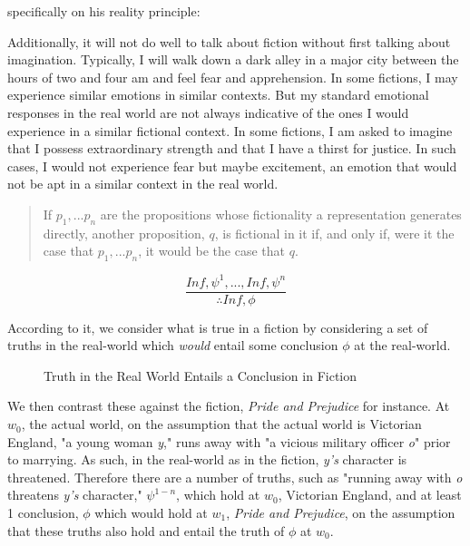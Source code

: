 \documentclass[phdthesis,12pt,final,a4paper]{wuthesis}
\theoremstyle{definition}
\theoremstyle{definition}
\theoremstyle{definition}
\theoremstyle{definition}
\theoremstyle{remark}
\begin{document}
specifically on his reality principle:

Additionally, it will not do well to talk about fiction without first talking about imagination. Typically, I will walk down a dark alley in a major city between the hours of two and four am and feel fear and apprehension. In some fictions, I may experience similar emotions in similar contexts. But my standard emotional responses in the real world are not always indicative of the ones I would experience in a similar fictional context. In some fictions, I am asked to imagine that I possess extraordinary strength and that I have a thirst for justice. In such cases, I would not experience fear but maybe excitement, an emotion that would not be apt in a similar context in the real world.

\begin{quote}
If \(p_{1}, . . . p_{n}\) are the propositions whose fictionality a representation generates directly, another proposition, \(q\), is fictional in it if, and only if, were it the case that \(p_{1}, . . . p_{n}\), it would be the case that \(q\).
\end{quote}

\[\frac{In f, \psi^{1}, . . ., In f, \psi^{n}}{\therefore In f, \phi}\]

According to it, we consider what is true in a fiction by considering a set of truths in the real-world which \emph{would} entail some conclusion \(\phi\) at the real-world.

\begin{figure}
\centering
\caption{Truth in the Real World Entails a Conclusion in Fiction}
\label{fig:truth-fiction}
\end{figure}

We then contrast these against the fiction, \emph{Pride and Prejudice} for instance. At \(w_{0}\), the actual world, on the assumption that the actual world is Victorian England, "a young woman \emph{y}," runs away with "a vicious military officer \emph{o}" prior to marrying. As such, in the real-world as in the fiction, \emph{y's} character is threatened. Therefore there are a number of truths, such as "running away with \emph{o} threatens \emph{y's} character," \(\psi^{1-n}\), which hold at \(w_{0}\), Victorian England, and at least 1 conclusion, \(\phi\) which would hold at \(w_{1}\), \emph{Pride and Prejudice}, on the assumption that these truths also hold and entail the truth of \(\phi\) at \(w_{0}\).
\end{document}
